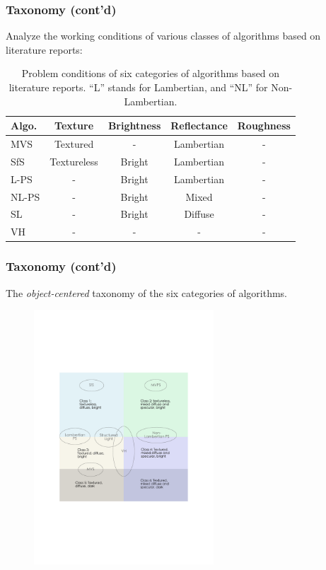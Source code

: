 \documentclass{beamer}
\begin{document}
\begin{frame}
\frametitle{Taxonomy (cont'd)}
Analyze the working conditions of various classes of algorithms based on literature reports:
\begin{table}
\begin{tabular}{l|cccc}
\toprule
Algo. & Texture & Brightness & Reflectance & Roughness\\
\midrule
MVS & Textured & - & Lambertian & -\\
SfS & Textureless & Bright & Lambertian & -\\
L-PS & - & Bright & Lambertian & -\\
NL-PS & - & Bright & Mixed & -\\
SL & - & Bright & Diffuse & -\\
VH & - & - & - & -\\
\bottomrule
\end{tabular}
\caption{Problem conditions of six categories of algorithms based on literature reports. ``L'' stands for Lambertian, and ``NL'' for Non-Lambertian.}
\end{table}

\end{frame}

\begin{frame}
\frametitle{Taxonomy (cont'd)}
The \textit{object-centered} taxonomy of the six categories of algorithms.
\begin{figure}[!htbp]
\includegraphics[width=0.6\textwidth]{taxo/six_class}
\end{figure}
\end{frame}
\end{document}
